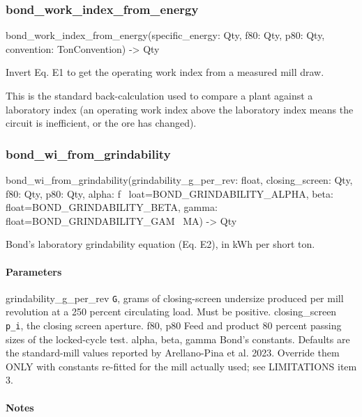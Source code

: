 \documentclass[10pt,a4paper,twoside]{report}
\begin{document}
\subsubsection*{bond\_work\_index\_from\_energy}

\begin{verbatimsmall}
bond_work_index_from_energy(specific_energy: Qty, f80: Qty, p80: Qty, convention: TonConvention) -> Qty
\end{verbatimsmall}

Invert Eq. E1 to get the operating work index from a measured mill draw.

This is the standard back-calculation used to compare a plant against a laboratory index (an operating work index above the laboratory index means the circuit is inefficient, or the ore has changed).

\subsubsection*{bond\_wi\_from\_grindability}

\begin{verbatimsmall}
bond_wi_from_grindability(grindability_g_per_rev: float, closing_screen: Qty, f80: Qty, p80: Qty, alpha: f
    \ loat=BOND_GRINDABILITY_ALPHA, beta: float=BOND_GRINDABILITY_BETA, gamma: float=BOND_GRINDABILITY_GAM
    \ MA) -> Qty
\end{verbatimsmall}

Bond's laboratory grindability equation (Eq. E2), in kWh per short ton.

\paragraph*{Parameters}

grindability\_g\_per\_rev \texttt{G}, grams of closing-screen undersize produced per mill revolution at a 250 percent circulating load. Must be positive. closing\_screen \texttt{p\_i}, the closing screen aperture. f80, p80 Feed and product 80 percent passing sizes of the locked-cycle test. alpha, beta, gamma Bond's constants. Defaults are the standard-mill values reported by Arellano-Pina et al. 2023. Override them ONLY with constants re-fitted for the mill actually used; see LIMITATIONS item 3.

\paragraph*{Notes}
\end{document}
